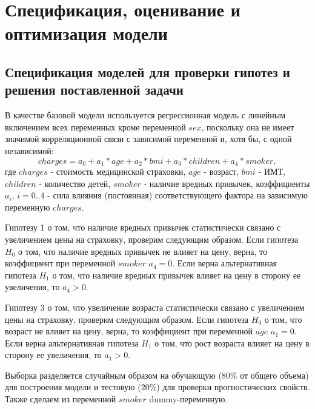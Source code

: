 \documentclass[a4paper,12pt]{article}
\begin{document}
\section{Спецификация, оценивание и оптимизация модели}

\subsection{Спецификация моделей для проверки гипотез и решения поставленной задачи}

В качестве базовой модели используется регрессионная модель с линейным включением всех переменных кроме переменной $sex$, поскольку она не имеет значимой корреляционной связи с зависимой переменной и, хотя бы, с одной независимой:
\[charges = a_0 + a_1 * age + a_2 * bmi + a_3 * children + a_4 * smoker,\]	
где $charges$ - стоимость медицинской страховки,
$age$ - возраст,
$bmi$ - ИМТ,
$children$ - количество детей,
$smoker$ - наличие вредных привычек, коэффициенты $a_i$, $i=0..4$ - сила влияния (постоянная) соответствующего фактора на зависимую переменную $charges$.

Гипотезу 1 о том, что наличие вредных привычек статистически связано с увеличением цены на страховку, проверим следующим образом. Если гипотеза $H_0$ о том, что наличие вредных привычек не влияет на цену, верна, то коэффициент при переменной $smoker$ $a_4 = 0$. Если верна альтернативная гипотеза $H_1$ о том, что наличие вредных привычек влияет на цену в сторону ее увеличения, то $a_4 > 0$.

Гипотезу 3 о том, что увеличение возраста статистически связано с увеличением цены на страховку, проверим следующим образом. Если гипотеза $H_0$ о том, что возраст не влияет на цену, верна, то коэффициент при переменной $age$ $a_1 = 0$. Если верна альтернативная гипотеза $H_1$ о том, что рост возраста влияет на цену в сторону ее увеличения, то $a_1 > 0$.

Выборка разделяется случайным образом на обучающую ($80\%$ от общего объема) для построения модели и тестовую ($20\%$) для проверки прогностических свойств. Также сделаем из переменной $smoker$ dummy-переменную.
\end{document}

